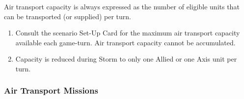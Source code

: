 \subsubsection{}
Air transport capacity is always expressed as the number of eligible units that can be transported (or supplied) per turn.

\begin{enumerate}[label=\alph*.]
    \item Consult the scenario Set-Up Card for the maximum air transport capacity available each game-turn. Air transport capacity cannot be accumulated.
    \item Capacity is reduced during Storm to only one Allied or one Axis unit per turn.
\end{enumerate}

\subsubsection{\textbf{Air Transport Missions}}
